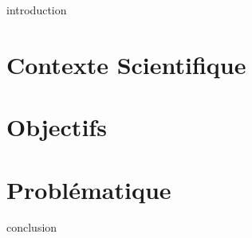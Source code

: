 
\chaptertoc{}

\label{sec:2-int}
{introduction}

\section{Contexte Scientifique}
\label{sec:2-1}

\section{Objectifs}
\label{sec:2-2}

\section{Problématique}
\label{sec:2-2}


\label{sec:2-cnc}
{conclusion}


